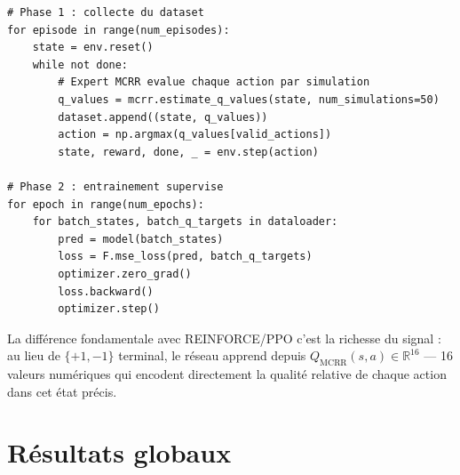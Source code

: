 \documentclass[12pt,a4paper]{article}
\begin{document}
\begin{lstlisting}
# Phase 1 : collecte du dataset
for episode in range(num_episodes):
    state = env.reset()
    while not done:
        # Expert MCRR evalue chaque action par simulation
        q_values = mcrr.estimate_q_values(state, num_simulations=50)
        dataset.append((state, q_values))
        action = np.argmax(q_values[valid_actions])
        state, reward, done, _ = env.step(action)

# Phase 2 : entrainement supervise
for epoch in range(num_epochs):
    for batch_states, batch_q_targets in dataloader:
        pred = model(batch_states)
        loss = F.mse_loss(pred, batch_q_targets)
        optimizer.zero_grad()
        loss.backward()
        optimizer.step()
\end{lstlisting}

La différence fondamentale avec REINFORCE/PPO c'est la richesse du signal : au lieu de $\{+1, -1\}$ terminal, le réseau apprend depuis $Q_\text{MCRR}(s, a) \in \mathbb{R}^{16}$ — 16 valeurs numériques qui encodent directement la qualité relative de chaque action dans cet état précis.

\section{Résultats globaux}
\end{document}
